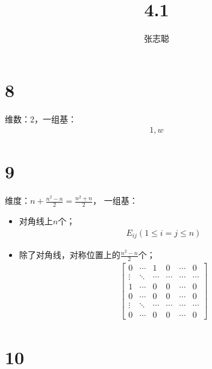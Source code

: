 \documentclass{article}
\begin{document}
\title{4.1}
\author{张志聪}
\maketitle

\section*{8}

维数：2，一组基：
\begin{align*}
  1, w
\end{align*}

\section*{9}

维度：$n + \frac{n^2 - n}{2} = \frac{n^2 + n}{2}$，
一组基：
\begin{itemize}
  \item 对角线上$n$个；
        \begin{align*}
          E_{ij} (1 \leq i=j \leq n)
        \end{align*}

  \item 除了对角线，对称位置上的$\frac{n^2 - n}{2}$个；
        \begin{align*}
          \begin{bmatrix}
            0      & \cdots & 1      & 0      & \cdots & 0      \\
            \vdots & \ddots & \cdots & \cdots & \cdots & \cdots \\
            1      & \cdots & 0      & 0      & \cdots & 0      \\
            0      & \cdots & 0      & 0      & \cdots & 0      \\
            \vdots & \ddots & \cdots & \cdots & \cdots & \cdots \\
            0      & \cdots & 0      & 0      & \cdots & 0
          \end{bmatrix}
        \end{align*}
\end{itemize}

\section*{10}
\end{document}
